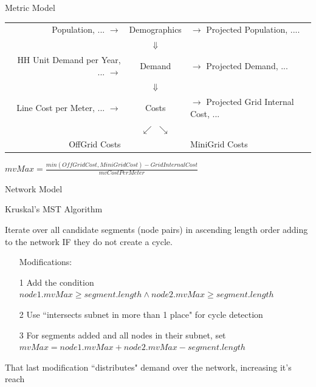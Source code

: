 \documentclass{beamer}
\begin{document}
\begin{frame}{Metric Model}
  \begin{tabular}{r c l}
    {\tiny Population, ...} $\rightarrow$ & Demographics &  $\rightarrow$ {\tiny Projected Population, ....} \\
    & $\Downarrow$ & \\
    {\tiny HH Unit Demand per Year, ...} $\rightarrow$ & Demand & $\rightarrow$ {\tiny Projected Demand, ...} \\
    & $\Downarrow$ & \\
        {\tiny Line Cost per Meter, ...} $\rightarrow$ & Costs & $\rightarrow$ {\tiny Projected Grid Internal Cost, ...} \\
    & $\swarrow$ $\searrow$ & \\
    OffGrid Costs & & MiniGrid Costs\\
  \end{tabular}

  \bigskip 

  \begin{center}
  $mvMax = \frac{min(OffGridCost, MiniGridCost) - GridInternalCost}{mvCostPerMeter}$
  \end{center}
\end{frame}

\begin{frame}{Network Model}
  \begin{center}
  Kruskal's MST Algorithm


  Iterate over all candidate segments (node pairs) in ascending length order adding to the network IF they do not create a cycle.

  \bigskip 

  \begin{itemize}
  \item[] Modifications:
  \item[1] Add the condition {\tiny $node1.mvMax \geq segment.length \wedge node2.mvMax \geq segment.length$}
  \item[2] Use ``intersects subnet in more than 1 place" for cycle detection
  \item[3] For segments added and all nodes in their subnet, set {\tiny $mvMax = node1.mvMax + node2.mvMax - segment.length$}
  \end{itemize}
  That last modification ``distributes" demand over the network, increasing it's reach

  \end{center}
\end{frame}
  
\end{document}
